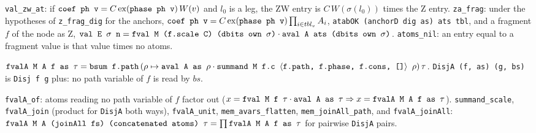 \begin{theorem}
\textnormal{\texttt{val\_\allowbreak{}zw\_\allowbreak{}at}}: if $\textnormal{\texttt{coef ph v}} = C\operatorname{ex}(\textnormal{\texttt{phase ph v}})\,W(v)$ and $l_0$ is a
leg, the ZW entry is $C\,W(\sigma(l_0))$ times the Z entry. \textnormal{\texttt{za\_\allowbreak{}frag}}: under the hypotheses of
\textnormal{\texttt{z\_\allowbreak{}frag\_\allowbreak{}dig}} for the anchors, $\textnormal{\texttt{coef ph v}} = C\operatorname{ex}(\textnormal{\texttt{phase ph v}})\prod_{i\in tbl_v}A_i$,
\textnormal{\texttt{atabOK (\allowbreak{}anchorD dig as) ats tbl}}, and a fragment $f$ of the node as Z,
$\textnormal{\texttt{val E \ensuremath{\sigma} n}} = \textnormal{\texttt{fval M (\allowbreak{}f.\allowbreak{}scale C) (\allowbreak{}dbits own \ensuremath{\sigma})}} \cdot \textnormal{\texttt{aval A ats (\allowbreak{}dbits own \ensuremath{\sigma})}}$.
\textnormal{\texttt{atoms\_\allowbreak{}nil}}: an entry equal to a fragment value is that value times no atoms.
\end{theorem}

\begin{definition}
$\textnormal{\texttt{fvalA M A f as \ensuremath{\tau}}} = \textnormal{\texttt{bsum f.\allowbreak{}path}}\,(\rho\mapsto\textnormal{\texttt{aval A as \ensuremath{\rho}}}\cdot\textnormal{\texttt{summand M f.\allowbreak{}c \ensuremath{\langle}f.\allowbreak{}path,\allowbreak{} f.\allowbreak{}phase,\allowbreak{} f.\allowbreak{}cons,\allowbreak{} []\ensuremath{\rangle} \ensuremath{\rho}}})\,\tau$.
\textnormal{\texttt{DisjA (\allowbreak{}f,\allowbreak{} as) (\allowbreak{}g,\allowbreak{} bs)}} is \textnormal{\texttt{Disj f g}} plus: no path variable of $f$ is read by $bs$.
\end{definition}
\noindent \textnormal{\texttt{fvalA\_\allowbreak{}of}}: atoms reading no path variable of $f$ factor out
($x = \textnormal{\texttt{fval M f \ensuremath{\tau}}}\cdot\textnormal{\texttt{aval A as \ensuremath{\tau}}}\Rightarrow x = \textnormal{\texttt{fvalA M A f as \ensuremath{\tau}}}$).
\textnormal{\texttt{summand\_\allowbreak{}scale}}, \textnormal{\texttt{fvalA\_\allowbreak{}join}} (product for \textnormal{\texttt{DisjA}} both ways), \textnormal{\texttt{fvalA\_\allowbreak{}unit}},
\textnormal{\texttt{mem\_\allowbreak{}avars\_\allowbreak{}flatten}}, \textnormal{\texttt{mem\_\allowbreak{}joinAll\_\allowbreak{}path}}, and \textnormal{\texttt{fvalA\_\allowbreak{}joinAll}}:
$\textnormal{\texttt{fvalA M A (\allowbreak{}joinAll fs) (\allowbreak{}concatenated atoms) \ensuremath{\tau}}} = \prod\textnormal{\texttt{fvalA M A f as \ensuremath{\tau}}}$ for pairwise
\textnormal{\texttt{DisjA}} pairs.


